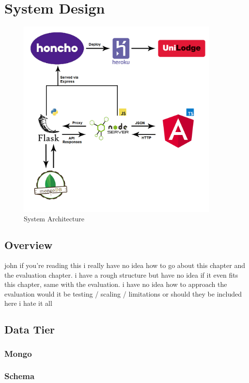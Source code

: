 \chapter{System Design}

\begin{figure}[H]
	\caption{System Architecture}
	\label{image:myImageName}
	\centering
	\includegraphics[width=0.9\textwidth]{images/design.png}
\end{figure}	

\section{Overview}
john if you're reading this i really have no idea how to go about this chapter and the evaluation chapter. i have a rough structure but have no idea if it even fits this chapter, same with the evaluation. i have no idea how to approach the evaluation would it be testing / scaling / limitations or should they be included here i hate it all
\section{Data Tier}
\subsection{Mongo}
\subsection{Schema}
